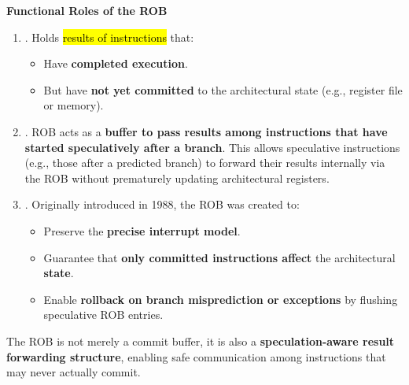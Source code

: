 \highspace
\begin{flushleft}
    \textcolor{Green3}{ \textbf{Functional Roles of the ROB}}
\end{flushleft}
\begin{enumerate}
    \item {}. Holds \hl{results of instructions} that:
    \begin{itemize}
        \item Have \textbf{completed execution}.
        \item But have \textbf{not yet committed} to the architectural state (e.g., register file or memory).
    \end{itemize}
    
    \item {}. ROB acts as a \textbf{buffer to pass results among instructions that have started speculatively after a branch}. This allows speculative instructions (e.g., those after a predicted branch) to forward their results internally via the ROB without prematurely updating architectural registers.
    
    \item {}. Originally introduced in 1988, the ROB was created to:
    \begin{itemize}
        \item Preserve the \textbf{precise interrupt model}.
        \item Guarantee that \textbf{only committed instructions affect} the architectural \textbf{state}.
        \item Enable \textbf{rollback on branch misprediction or exceptions} by flushing speculative ROB entries.
    \end{itemize}
\end{enumerate}
The ROB is not merely a commit buffer, it is also a \textbf{speculation-aware result forwarding structure}, enabling safe communication among instructions that may never actually commit.
